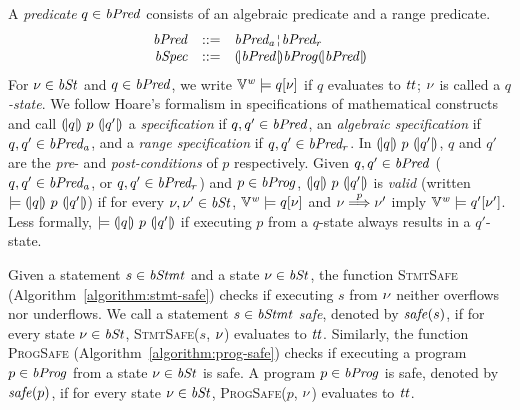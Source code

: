 A \emph{predicate} $q \in \mathit{bPred}$ consists of an algebraic predicate and a range predicate.
\[
\begin{array}{rcl}
  \bvPred & ::= & \bvPreda \andar \bvPredr \\
  \bvSpec & ::= & \cond{\bvPred} \bvProg \cond{\bvPred}
\end{array}
\]
For $\nu \in \mathit{bSt}$ and $q \in \mathit{bPred}$, we write $\mathbb{V}^{\mathit{w}} \models q[\nu]$ if $q$ evaluates to $\mathit{tt}$; $\nu$ is called a \emph{$q$-state}.
We follow Hoare's formalism in specifications of mathematical constructs~\cite{H:69:ABCP} and call ${(\!|}{q}{|\!)}~{p}~{(\!|}{q'}{|\!)}$ a \emph{specification} if $q,q' \in \mathit{bPred}$, an \emph{algebraic specification} if $q,q' \in \mathit{bPred_a}$, and a \emph{range specification} if $q,q' \in \mathit{bPred_r}$.
In ${(\!|}{q}{|\!)}~{p}~{(\!|}{q'}{|\!)}$, $q$ and $q'$ are the \emph{pre}- and \emph{post-conditions} of $p$ respectively.
Given $q, q' \in \mathit{bPred}$ ($q,q' \in \mathit{bPred_a}$, or $q,q' \in \mathit{bPred_r}$) and $p \in \mathit{bProg}$, ${(\!|}{q}{|\!)}~{p}~{(\!|}{q'}{|\!)}$ is \emph{valid} (written $\models {(\!|}{q}{|\!)}~{p}~{(\!|}{q'}{|\!)}$) if for every $\nu, \nu' \in \mathit{bSt}$, $\mathbb{V}^{\mathit{w}} \models q[\nu]$ and $\nu \overset{p}{\Longrightarrow} \nu'$ imply $\mathbb{V}^{\mathit{w}} \models q'[\nu']$.
Less formally, $\models {(\!|}{q}{|\!)}~{p}~{(\!|}{q'}{|\!)}$ if executing $p$ from a $q$-state always results in a $q'$-state.

Given a statement $s \in \mathit{bStmt}$ and a state $\nu \in \mathit{bSt}$, the function \textsc{StmtSafe} (Algorithm~\ref{algorithm:stmt-safe}) checks if executing $s$ from $\nu$ neither overflows nor underflows.
We call a statement $s \in \mathit{bStmt}$ \emph{safe}, denoted by $\mathit{safe}(s)$, if for every state $\nu \in \mathit{bSt}$, \textsc{StmtSafe}($s$, $\nu$) evaluates to $\mathit{tt}$.
Similarly, the function \textsc{ProgSafe} (Algorithm~\ref{algorithm:prog-safe}) checks if executing a program $p \in \mathit{bProg}$ from a state $\nu \in \mathit{bSt}$ is safe.
A program $p \in \mathit{bProg}$ is safe, denoted by $\mathit{safe}(p)$, if for every state $\nu \in \mathit{bSt}$, \textsc{ProgSafe}($p$, $\nu$) evaluates to $\mathit{tt}$.


